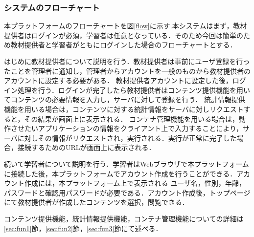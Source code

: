 \subsubsection{システムのフローチャート}
本プラットフォームのフローチャートを図\ref{flow}に示す.本システムはまず，教材提供者はログインが必須，学習者は任意となっている．そのため今回は簡単のため教材提供者と学習者がともにログインした場合のフローチャートとする．

はじめに教材提供者について説明を行う．教材提供者は事前にユーザ登録を行ったことを管理者に通知し，管理者からアカウントを一般のものから教材提供者のアカウントに設定する必要がある．
教材提供者アカウントに設定した後，ログイン処理を行う．ログインが完了したら教材提供者はコンテンツ提供機能を用いてコンテンツの必要情報を入力し，サーバに対して登録を行う．
統計情報提供機能を用いる場合は，コンテンツに対する統計情報をサーバに対しリクエストすると，その結果が画面上に表示される．
コンテナ管理機能を用いる場合は，動作させたいアプリケーションの情報をクライアント上で入力することにより，サーバに対しその情報がリクエストされ，実行される．実行が正常に完了した場合，接続するためのURLが画面上に表示される．

続いて学習者について説明を行う．学習者はWebブラウザで本プラットフォームに接続した後，本プラットフォームでアカウント作成を行うことができる．アカウント作成には，本プラットフォーム上で表示される
ユーザ名，性別，年齢，パスワードと確認用パスワードが必要である．アカウント作成後，トップページにて教材提供者が作成したコンテンツを選択，閲覧できる．


コンテンツ提供機能，統計情報提供機能，コンテナ管理機能についての詳細は\ref{sec:fun1}節，\ref{sec:fun2}節，\ref{sec:fun3}節にて述べる．
